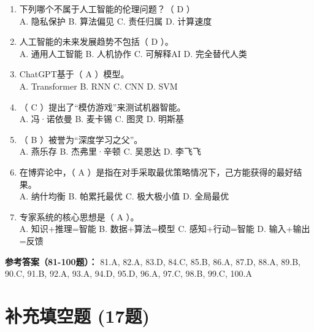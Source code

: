\begin{enumerate}[resume,leftmargin=2em,itemsep=1pt]
\item 下列哪个不属于人工智能的伦理问题？（ D ）
\\ A. 隐私保护 B. 算法偏见 C. 责任归属 D. 计算速度
\item 人工智能的未来发展趋势不包括（ D ）。
\\ A. 通用人工智能 B. 人机协作 C. 可解释AI D. 完全替代人类
\item ChatGPT基于（ A ）模型。
\\ A. Transformer B. RNN C. CNN D. SVM
\item （ C ）提出了“模仿游戏”来测试机器智能。
\\ A. 冯·诺依曼 B. 麦卡锡 C. 图灵 D. 明斯基
\item （ B ）被誉为“深度学习之父”。
\\ A. 燕乐存 B. 杰弗里·辛顿 C. 吴恩达 D. 李飞飞
\item 在博弈论中，（ A ）是指在对手采取最优策略情况下，己方能获得的最好结果。
\\ A. 纳什均衡 B. 帕累托最优 C. 极大极小值 D. 全局最优
\item 专家系统的核心思想是（ A ）。
\\ A. 知识+推理=智能 B. 数据+算法=模型 C. 感知+行动=智能 D. 输入+输出=反馈
\end{enumerate}

\textbf{参考答案（81-100题）：}
81.A, 82.A, 83.D, 84.C, 85.B, 86.A, 87.D, 88.A, 89.B, 90.C, 
91.B, 92.A, 93.A, 94.D, 95.D, 96.A, 97.C, 98.B, 99.C, 100.A

\section{补充填空题 (17题)}

